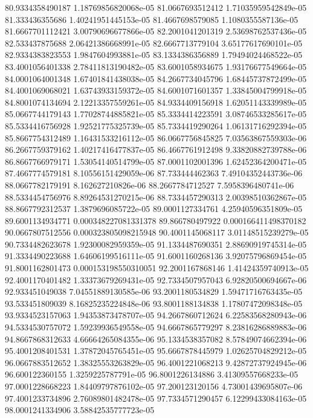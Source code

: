 {80.9334358490187 1.18769856820068e-05
81.0667693512412 1.71035959542849e-05
81.333436355686 1.40241951445153e-05
81.4667698579085 1.1080355587136e-05
81.6667701112421 3.00790696677866e-05
82.2001041201319 2.53698762537436e-05
82.533437875688 2.06421386668991e-05
82.6667713779104 3.65177617690101e-05
82.9334383823553 1.9847604993881e-05
83.1334386356889 1.79494024468522e-05
83.4001056401338 2.78411813190482e-05
83.6001058934675 1.93176677549664e-05
84.0001064001348 1.67401841438038e-05
84.2667734045796 1.68445737872499e-05
84.4001069068021 1.63743933159372e-05
84.6001071601357 1.33845004799918e-05
84.8001074134694 2.12213357559261e-05
84.9334409156918 1.62051143339989e-05
85.0667744179143 1.77028744885821e-05
85.3334414223591 3.08746533285617e-05
85.5334416756928 1.92521775325739e-05
85.7334419290264 1.06131716292394e-05
85.8667754312489 1.16431533216112e-05
86.0667756845825 7.03563867559303e-06
86.2667759379162 1.40217416477837e-05
86.4667761912498 9.33820882739788e-06
86.8667766979171 1.53054140514799e-05
87.0001102001396 1.62452364200471e-05
87.4667774579181 8.10556151429059e-06
87.733444462363 7.49104352443736e-06
88.0667782179191 8.162627210826e-06
88.2667784712527 7.5958396480741e-06
88.5334454756976 8.89264531270215e-06
88.7334457290313 2.00398510362867e-05
88.8667792312537 1.3879696085722e-05
89.0001127334761 4.25940596351809e-05
89.6001134934771 0.000348227081331378
89.866780497922 0.000166411498370182
90.0667807512556 0.000323805098215948
90.4001145068117 3.01148515239279e-05
90.7334482623678 1.92300082959359e-05
91.1334487690351 2.88690919745314e-05
91.3334490223688 1.64606199516111e-05
91.6001160268136 3.92075796869454e-05
91.8001162801473 0.000153198550310051
92.2001167868146 1.41424359740913e-05
92.4001170401482 1.33373679269431e-05
92.7334507957043 6.92820500694667e-06
92.933451049038 7.04551889130585e-06
93.2001180534829 1.59471716763435e-05
93.533451809039 8.16825235224848e-06
93.8001188134838 1.17807472098348e-05
93.9334523157063 1.94353873478707e-05
94.2667860712624 6.22583568280943e-06
94.5334530757072 1.59239936549558e-05
94.6667865779297 8.23816286889883e-06
94.8667868312633 4.66664265084355e-06
95.1334538357082 8.57849074662394e-06
95.4001208401531 1.37872045765451e-05
95.6667878445979 1.02625704829212e-05
96.0667883512652 1.38325553263829e-05
96.4001221068213 9.42872737924945e-06
96.600122360155 1.3259225787791e-05
96.8001226134886 3.41309557668233e-05
97.0001228668223 1.84409797876102e-05
97.200123120156 4.73001439695807e-06
97.4001233734896 2.76089801482478e-05
97.7334571290457 6.12299433084163e-05
98.0001241334906 3.58842535777723e-05
}
